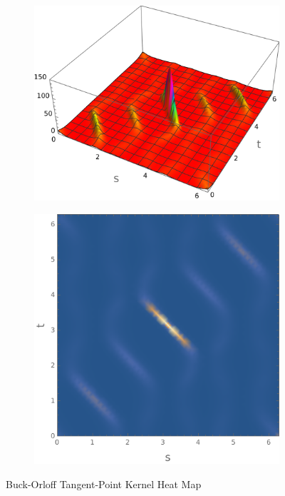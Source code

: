 \documentclass{beamer}
\theoremstyle{remark}
\begin{document}
\begin{frame}
    \begin{figure}[h]
        \centering
        \begin{subfigure}[b]{0.45\textwidth}
            \centering
            \includegraphics[width=\textwidth]{kHeatMap1.png}
        \end{subfigure}
        \begin{subfigure}[b]{0.45\textwidth}
            \centering
            \includegraphics[width=\textwidth]{kHeatMap2.png}
        \end{subfigure}
        \caption{Buck-Orloff Tangent-Point Kernel Heat Map}
    \end{figure}
\end{frame}
\end{document}
